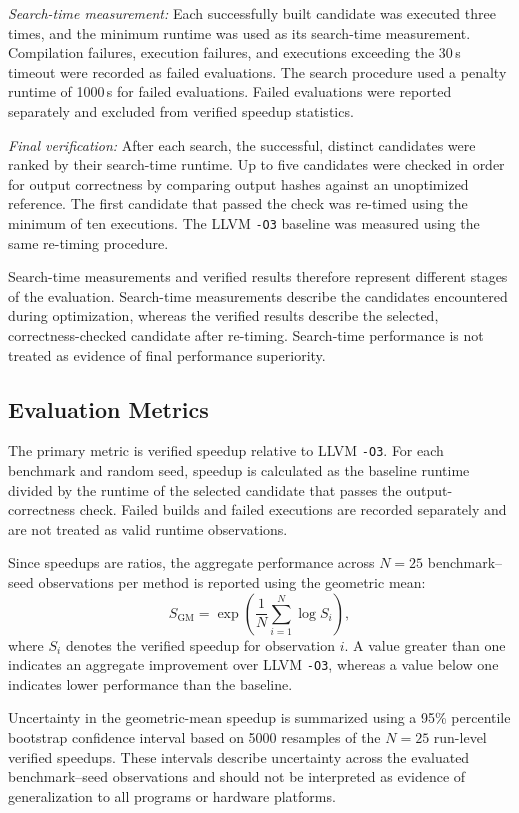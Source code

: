 \textit{Search-time measurement:} Each successfully built candidate was executed three times, and the minimum runtime was used as its search-time measurement. Compilation failures, execution failures, and executions exceeding the 30\,s timeout were recorded as failed evaluations. The search procedure used a penalty runtime of 1000\,s for failed evaluations. Failed evaluations were reported separately and excluded from verified speedup statistics.

\textit{Final verification:} After each search, the successful, distinct candidates were ranked by their search-time runtime. Up to five candidates were checked in order for output correctness by comparing output hashes against an unoptimized reference. The first candidate that passed the check was re-timed using the minimum of ten executions. The LLVM \texttt{-O3} baseline was measured using the same re-timing procedure.

Search-time measurements and verified results therefore represent different stages of the evaluation. Search-time measurements describe the candidates encountered during optimization, whereas the verified results describe the selected, correctness-checked candidate after re-timing. Search-time performance is not treated as evidence of final performance superiority.

\subsection{Evaluation Metrics}
The primary metric is verified speedup relative to LLVM \texttt{-O3}. For each benchmark and random seed, speedup is calculated as the baseline runtime divided by the runtime of the selected candidate that passes the output-correctness check. Failed builds and failed executions are recorded separately and are not treated as valid runtime observations.

Since speedups are ratios, the aggregate performance across $N = 25$ benchmark--seed observations per method is reported using the geometric mean:
\begin{equation}
S_{\mathrm{GM}} = \exp\!\left(\frac{1}{N}\sum_{i=1}^{N}\log S_i\right),
\end{equation}
where $S_i$ denotes the verified speedup for observation $i$. A value greater than one indicates an aggregate improvement over LLVM \texttt{-O3}, whereas a value below one indicates lower performance than the baseline.

Uncertainty in the geometric-mean speedup is summarized using a 95\% percentile bootstrap confidence interval based on 5000 resamples of the $N = 25$ run-level verified speedups. These intervals describe uncertainty across the evaluated benchmark--seed observations and should not be interpreted as evidence of generalization to all programs or hardware platforms.

